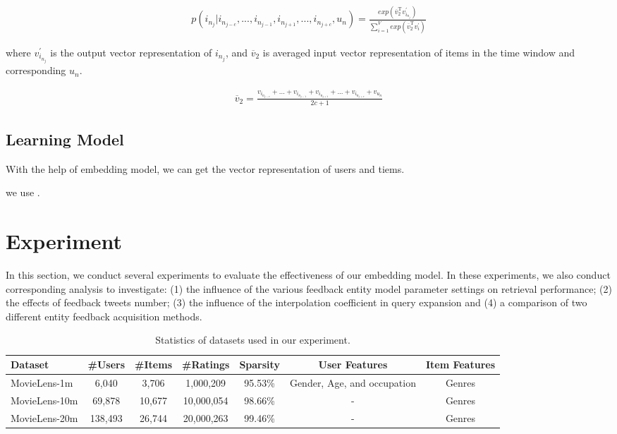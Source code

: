 \documentclass{sig-alternate-05-2015}
\begin{document}
\begin{equation}
\begin{aligned}
	p(i_{n_j} | i_{n_{j-c}}, ..., i_{n_{j-1}}, i_{n_{j+1}},..., i_{n_{j+c}}, u_n) =
	\frac
	{
		exp( \overline{v}_{2}^{\mathrm{T}} v_{i_{n_j}}^{'} )
	}
	{
		\sum_{i=1}^{V} exp( \overline{v}_{2}^{\mathrm{T}} v_{i}^{'} )
	}
\end{aligned}
\end{equation}

where $v_{i_{n_j}}^{'}$ is the output vector representation of $i_{n_j}$,
and $\overline{v}_{2}$ is averaged input vector representation of items in the time window
and corresponding $u_n$.

\begin{equation}
\begin{aligned}
	\overline{v}_{2} = \frac{ v_{i_{n_{j-c}}} + ... + v_{i_{n_{j-1}}} + 
	v_{i_{n_{j+1}}} + ... + v_{i_{n_{j+c}}} + v_{u_n} }{2c+1}
\end{aligned}
\end{equation}


\subsection{Learning Model}
With the help of embedding model, we can get the vector representation of users and tiems.


we use \cite{chen2012svdfeature}.


\section{Experiment}
In this section, we conduct several experiments to evaluate the effectiveness of our embedding model.
In these experiments, we also conduct corresponding analysis to investigate:
(1) the influence of the various feedback entity model parameter settings on
retrieval performance;
(2) the effects of feedback tweets number;
(3) the influence of the interpolation coefficient in query expansion and
(4) a comparison of two different entity feedback acquisition methods.



\begin{table}[htpb]
	\centering
	\caption{Statistics of datasets used in our experiment.}
	\label{tab:topics}
	\begin{tabular}{|l|c|c|c|c|c|c|}
		\hline
		\textbf{Dataset} & \textbf{\#Users} & \textbf{\#Items} & \textbf{\#Ratings} & \textbf{Sparsity} & \textbf{User Features} & \textbf{Item Features} \\
		\hline
		MovieLens-1m  & 6,040   & 3,706  & 1,000,209  & 95.53\% & Gender, Age, and occupation & Genres \\
		MovieLens-10m & 69,878  & 10,677 & 10,000,054 & 98.66\% & - & Genres \\
		MovieLens-20m & 138,493 & 26,744 & 20,000,263 & 99.46\% & - & Genres \\
		\hline
	\end{tabular}
\end{table}
\end{document}
